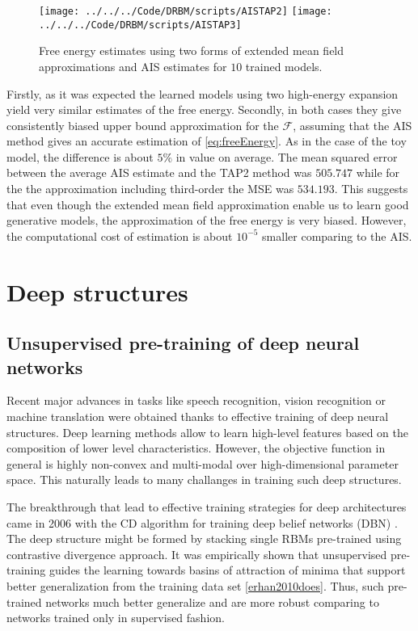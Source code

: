 \begin{figure}[!htb]
%
 \texttt{[image: ../../../Code/DRBM/scripts/AISTAP2]}
\endminipage 
{}  
 \texttt{[image: ../../../Code/DRBM/scripts/AISTAP3]}
\endminipage\hfill
  \caption[Comparison of AIS and EMF on RBM with $500$ hidden units]{Free energy estimates using two forms of extended mean field approximations and AIS estimates for $10$ trained models.}
  \label{fig:AISTAP2}
\end{figure}

Firstly, as it was expected the learned models using two high-energy expansion yield very similar estimates of the free energy. Secondly, in both cases they give consistently biased upper bound approximation for the $\mathcal{F}$, assuming that the AIS method gives an accurate estimation of \ref{eq:freeEnergy}. As in the case of the toy model, the difference is about $5 \%$ in value on average. The mean squared error between the average AIS estimate and the TAP2 method was $505.747$ while for the the approximation including third-order the MSE was $534.193$. This suggests that even though the extended mean field approximation enable us to learn good generative models, the approximation of the free energy is very biased. However, the computational cost of estimation is about $10^{-5}$ smaller comparing to the AIS.

\section{Deep structures}
\subsection{Unsupervised pre-training of deep neural networks}
Recent major advances in tasks like speech recognition, vision recognition or machine translation were obtained thanks to effective training of deep neural structures. Deep learning methods allow to learn high-level features based on the composition of lower level characteristics. However, the objective function in general is highly non-convex and multi-modal over high-dimensional parameter space. This naturally leads to many challanges in training such deep structures.
 
The breakthrough that lead to effective training strategies for deep architectures came in 2006 with the CD algorithm for training deep belief networks (DBN) \cite{hinton2006reducing}. The deep structure might be formed by stacking single RBMs pre-trained using contrastive divergence approach. It was empirically shown that unsupervised pre-training guides the learning towards basins of attraction of minima that support better generalization from the training data set \ref{erhan2010does}. Thus, such pre-trained networks much better generalize and are more robust comparing to networks trained only in supervised fashion.

